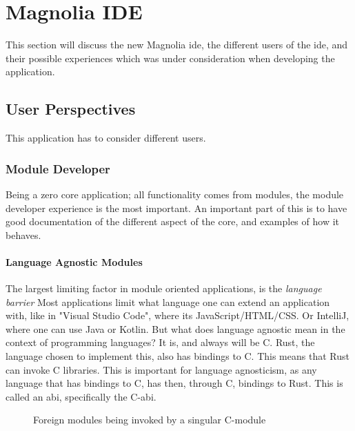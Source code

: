 \chapter{Magnolia IDE} \label{cha:ide}

This section will discuss the new Magnolia \gls{ide}, the different users of the
\gls{ide}, and their possible experiences which was under consideration when
developing the application.

\section{User Perspectives}

This application has to consider different users.

\subsection{Module Developer}

Being a zero core application; all functionality comes from modules, the module
developer experience is the most important. An important part of this is to have
good documentation of the different aspect of the core, and examples of how it
behaves.

\subsubsection{Language Agnostic Modules}

The largest limiting factor in module oriented applications, is the
\textit{language barrier} Most applications limit what language one can extend
an application with, like in "Visual Studio Code", where its
JavaScript/HTML/CSS. Or IntelliJ, where one can use Java or Kotlin. But what
does language agnostic mean in the context of programming languages? It is, and
always will be C. Rust, the language chosen to implement this, also has bindings
to C. This means that Rust can invoke C libraries. This is important for
language agnosticism, as any language that has bindings to C, has then, through
C, bindings to Rust. This is called an \gls{abi}, specifically the C-\gls{abi}.

\begin{figure}
  \begin{center}
    
    \caption{Foreign modules being invoked by a singular C-module}
    \label{fig:fm1}
  \end{center}
\end{figure}

